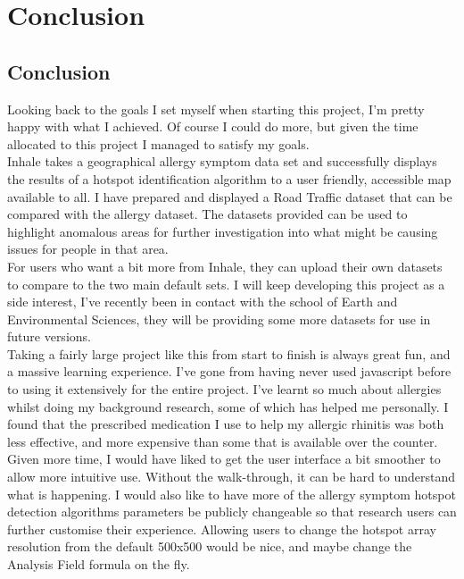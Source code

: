 \chapter{Conclusion}
\label{cha:conc}

\section{Conclusion}

Looking back to the goals I set myself when starting this project, I'm pretty happy with what I achieved. Of course I could do more, but given the time allocated to this project I managed to satisfy my goals.\\

Inhale takes a geographical allergy symptom data set and successfully displays the results of a hotspot identification algorithm to a user friendly, accessible map available to all. I have prepared and displayed a Road Traffic dataset that can be compared with the allergy dataset. The datasets provided can be used to highlight anomalous areas for further investigation into what might be causing issues for people in that area.\\

For users who want a bit more from Inhale, they can upload their own datasets to compare to the two main default sets. I will keep developing this project as a side interest, I've recently been in contact with the school of Earth and Environmental Sciences, they will be providing some more datasets for use in future versions.\\

Taking a fairly large project like this from start to finish is always great fun, and a massive learning experience. I've gone from having never used javascript before to using it extensively for the entire project. I've learnt so much about allergies whilst doing my background research, some of which has helped me personally. I found that the prescribed medication I use to help my allergic rhinitis was both less effective, and more expensive than some that is available over the counter.\\

Given more time, I would have liked to get the user interface a bit smoother to allow more intuitive use. Without the walk-through, it can be hard to understand what is happening. I would also like to have more of the allergy symptom hotspot detection algorithms parameters be publicly changeable so that research users can further customise their experience. Allowing users to change the hotspot array resolution from the default 500x500 would be nice, and maybe change the Analysis Field formula on the fly.\\